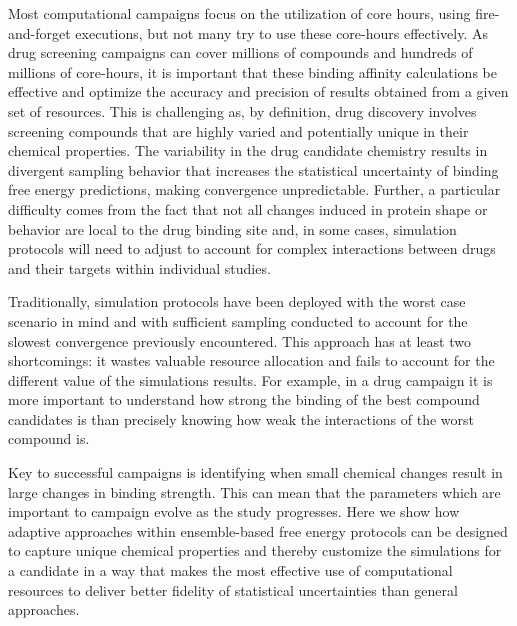 
Most computational campaigns focus on the utilization of core hours, using
fire-and-forget executions, but not many try to use these core-hours
effectively. As drug screening campaigns can cover millions of compounds and
hundreds of millions of core-hours, it is important that these binding
affinity calculations be effective and optimize the accuracy and precision of
results obtained from a given set of resources. This is challenging as, by
definition, drug discovery involves screening compounds that are highly varied
and potentially unique in their chemical properties. The variability in the
drug candidate chemistry results in divergent sampling behavior that increases
the statistical uncertainty of binding free energy predictions, making
convergence unpredictable. Further, a particular difficulty comes from the
fact that not all changes induced in protein shape or behavior are local to
the drug binding site and, in some cases, simulation protocols will need to
adjust to account for complex interactions between drugs and their targets
within individual studies.

Traditionally, simulation protocols have been deployed with the worst case
scenario in mind and with sufficient sampling conducted to account for the
slowest convergence previously encountered. This approach has at least two
shortcomings: it wastes valuable resource allocation and fails to account
for the different value of the simulations results. For example, in a drug
campaign it is more important to understand how strong the binding of the
best compound candidates is than precisely knowing how weak the interactions
of the worst compound is.


Key to successful campaigns is identifying when small chemical changes
result in large changes in binding strength. This can mean that the
parameters which are important to campaign evolve as the study progresses.
Here we show how adaptive approaches within ensemble-based free energy
protocols can be designed to capture unique chemical properties and thereby
customize the simulations for a candidate in a way that makes the most
effective use of computational resources to deliver better fidelity of
statistical uncertainties than general approaches.

